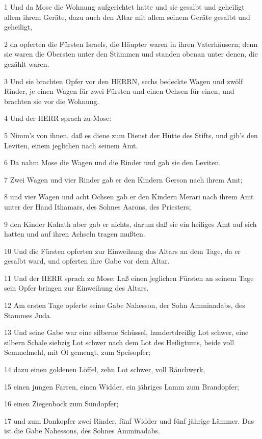 \par 1 Und da Mose die Wohnung aufgerichtet hatte und sie gesalbt und geheiligt allem ihrem Geräte, dazu auch den Altar mit allem seinem Geräte gesalbt und geheiligt,
\par 2 da opferten die Fürsten Israels, die Häupter waren in ihren Vaterhäusern; denn sie waren die Obersten unter den Stämmen und standen obenan unter denen, die gezählt waren.
\par 3 Und sie brachten Opfer vor den HERRN, sechs bedeckte Wagen und zwölf Rinder, je einen Wagen für zwei Fürsten und einen Ochsen für einen, und brachten sie vor die Wohnung.
\par 4 Und der HERR sprach zu Mose:
\par 5 Nimm's von ihnen, daß es diene zum Dienst der Hütte des Stifts, und gib's den Leviten, einem jeglichen nach seinem Amt.
\par 6 Da nahm Mose die Wagen und die Rinder und gab sie den Leviten.
\par 7 Zwei Wagen und vier Rinder gab er den Kindern Gerson nach ihrem Amt;
\par 8 und vier Wagen und acht Ochsen gab er den Kindern Merari nach ihrem Amt unter der Hand Ithamars, des Sohnes Aarons, des Priesters;
\par 9 den Kinder Kahath aber gab er nichts, darum daß sie ein heiliges Amt auf sich hatten und auf ihren Achseln tragen mußten.
\par 10 Und die Fürsten opferten zur Einweihung das Altars an dem Tage, da er gesalbt ward, und opferten ihre Gabe vor dem Altar.
\par 11 Und der HERR sprach zu Mose: Laß einen jeglichen Fürsten an seinem Tage sein Opfer bringen zur Einweihung des Altars.
\par 12 Am ersten Tage opferte seine Gabe Nahesson, der Sohn Amminadabs, des Stammes Juda.
\par 13 Und seine Gabe war eine silberne Schüssel, hundertdreißig Lot schwer, eine silbern Schale siebzig Lot schwer nach dem Lot des Heiligtums, beide voll Semmelmehl, mit Öl gemengt, zum Speisopfer;
\par 14 dazu einen goldenen Löffel, zehn Lot schwer, voll Räuchwerk,
\par 15 einen jungen Farren, einen Widder, ein jähriges Lamm zum Brandopfer;
\par 16 einen Ziegenbock zum Sündopfer;
\par 17 und zum Dankopfer zwei Rinder, fünf Widder und fünf jährige Lämmer. Das ist die Gabe Nahessons, des Sohnes Amminadabs.
